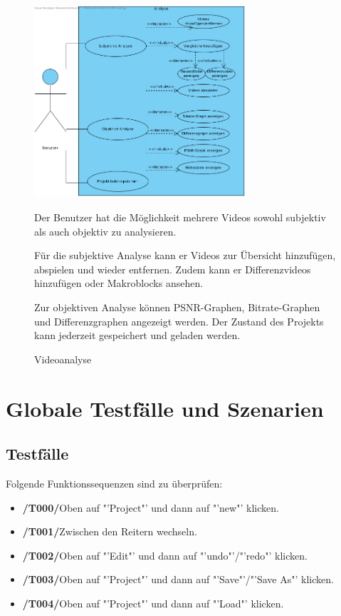 \documentclass[parskip=full]{scrartcl}
\begin{document}
\begin{figure}[htbp]
{\centering
\includegraphics[width=0.7\textwidth]{UsecaseDiagrams/Analyse.png}
\caption{Videoanalyse} }
\bigskip
Der Benutzer hat die Möglichkeit mehrere Videos sowohl subjektiv als auch objektiv zu analysieren. 

Für die subjektive Analyse kann er Videos zur Übersicht hinzufügen, abspielen und wieder entfernen. Zudem kann er Differenzvideos hinzufügen oder Makroblocks ansehen.

Zur objektiven Analyse können PSNR-Graphen, Bitrate-Graphen und Differenzgraphen angezeigt werden.
Der Zustand des Projekts kann jederzeit gespeichert und geladen werden.

\end{figure}
\newpage
\section{Globale Testfälle und Szenarien}
\subsection{Testfälle}
Folgende Funktionssequenzen sind zu überprüfen:
\begin{itemize}
\item[]\textbf{/T000/}\qquad Oben auf "'Project"' und dann auf "'new"' klicken.
\item[]\textbf{/T001/}\qquad Zwischen den Reitern wechseln.
\item[]\textbf{/T002/}\qquad Oben auf "'Edit"' und dann auf "'undo"'/"'redo"' klicken.
\item[]\textbf{/T003/}\qquad Oben auf "'Project"' und dann auf "'Save"'/"'Save As"' klicken.
\item[]\textbf{/T004/}\qquad Oben auf "'Project"' und dann auf "'Load"' klicken.
\end{itemize}
\end{document}
